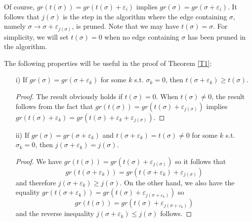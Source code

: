 \documentclass[12pt]{amsart}
\theoremstyle{definition}
\theoremstyle{remark}
\numberwithin{equation}{section}
\newcommand{\lra}{{\longrightarrow}}
\begin{document}
\vskip 3mm

Of course, $gr(t(\sigma))=gr(t(\sigma) + \varepsilon_i)$  implies $gr(\sigma)=gr(\sigma + \varepsilon_i)$. It follows that $j(\sigma)$
is the step in the algorithm where the edge containing $\sigma$, namely $\sigma \lra \sigma + \varepsilon_{j(\sigma)}$, is pruned.
 Note that we may  have $t(\sigma)=\sigma$.
 For simplicity, we will set $t(\sigma)=0$ when no edge containing $\sigma$ has been pruned
 in the algorithm.


 \vskip 4mm

The following properties will be useful in the proof of Theorem \ref{T1}:

\vskip 2mm

 \begin{itemize}
 \item[i)] If $gr(\sigma)=gr(\sigma + \varepsilon_k)$ for some $k$ s.t. $\sigma_k=0$, then $t(\sigma  + \varepsilon_k) \geq t(\sigma)$.

 \vskip 2mm


 \begin{proof} The result obviously holds if $t(\sigma)=0$. When $t(\sigma)\neq 0$, 
 the result follows
 from the fact that $gr(t(\sigma) )=gr(t(\sigma) + \varepsilon_{j(\sigma)})$ implies
 $gr(t(\sigma)+ \varepsilon_k )=gr(t(\sigma) + \varepsilon_k + \varepsilon_{j(\sigma)})$.
 \end{proof}


 \vskip 2mm

 \item[ii)] If $gr(\sigma)=gr(\sigma + \varepsilon_k)$  and  $t(\sigma  + \varepsilon_k) = t(\sigma) \neq 0$
 for some $k$ s.t. $\sigma_k=0$,
 then $j(\sigma  + \varepsilon_k) = j(\sigma)$.

  \vskip 2mm


 \begin{proof}
 We have $gr(t(\sigma) )=gr(t(\sigma) + \varepsilon_{j(\sigma)})$ so it follows that
 $$gr(t(\sigma + \varepsilon_k) )=gr(t(\sigma + \varepsilon_k) + \varepsilon_{j(\sigma)})$$ and therefore
 $j(\sigma  + \varepsilon_k) \geq j(\sigma)$.  On the other hand, we also have the equality
 $gr(t(\sigma + \varepsilon_k) )=gr(t(\sigma) + \varepsilon_{j(\sigma + \varepsilon_k)})$
 so  $$gr(t(\sigma) )=gr(t(\sigma ) + \varepsilon_{j(\sigma + \varepsilon_k)})$$ and the reverse inequality
 $j(\sigma  + \varepsilon_k) \leq j(\sigma)$ follows.
 \end{proof}


\end{itemize}
\end{document}
